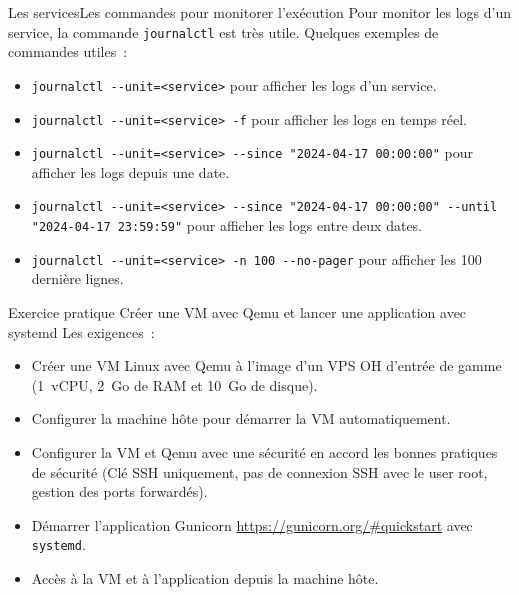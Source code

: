 \documentclass{beamer}
\begin{document}
    \begin{frame}{Les services}{Les commandes pour monitorer l'exécution}
        Pour monitor les logs d'un service, la commande \lstinline{journalctl} est très utile.
        \bigbreak
        Quelques exemples de commandes utiles~:
        \begin{itemize}
            \item \lstinline{journalctl --unit=<service>} pour afficher les logs d'un service.
            \item \lstinline{journalctl --unit=<service> -f} pour afficher les logs en temps réel.
            \item \lstinline{journalctl --unit=<service> --since "2024-04-17 00:00:00"} pour afficher les logs depuis une date.
            \item \lstinline{journalctl --unit=<service> --since "2024-04-17 00:00:00" --until "2024-04-17 23:59:59"} pour afficher les logs entre deux dates.
            \item \lstinline{journalctl --unit=<service> -n 100 --no-pager} pour afficher les 100 dernière lignes.
        \end{itemize}
    \end{frame}

    \begin{frame}{Exercice pratique \execcounterdispinc{}}{Créer une VM avec Qemu et lancer une application avec systemd}
        Les exigences~:
        \begin{itemize}
            \item Créer une VM Linux avec Qemu à l'image d'un VPS OH d'entrée de gamme (1~vCPU, 2~Go de RAM et 10~Go de disque).
            \item Configurer la machine hôte pour démarrer la VM automatiquement.
            \item Configurer la VM et Qemu avec une sécurité en accord les bonnes pratiques de sécurité (Clé SSH uniquement, pas de connexion SSH avec le user root, gestion des ports forwardés).
            \item Démarrer l'application Gunicorn  \url{https://gunicorn.org/\#quickstart} avec \lstinline{systemd}.
            \item Accès à la VM et à l'application depuis la machine hôte.
        \end{itemize}
    \end{frame}
\end{document}
